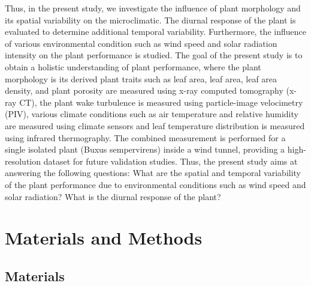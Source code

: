 Thus, in the present study, we investigate the influence of plant morphology and its spatial variability on the microclimatic. The diurnal response of the plant is evaluated to determine additional temporal variability. Furthermore, the influence of various environmental condition such as wind speed and solar radiation intensity on the plant performance is studied. The goal of the present study is to obtain a holistic understanding of plant performance, where the plant morphology is its derived plant traits such as leaf area, leaf area, leaf area density, and plant porosity are measured using x-ray computed tomography (x-ray CT), the plant wake turbulence is measured using particle-image velocimetry (PIV), various climate conditions such as air temperature and relative humidity are measured using climate sensors and leaf temperature distribution is measured using infrared thermography. The combined measurement is performed for a single isolated plant (Buxus sempervirens) inside a wind tunnel, providing a high-resolution dataset for future validation studies. Thus, the present study aims at answering the following questions: What are the spatial and temporal variability of the plant performance due to environmental conditions such as wind speed and solar radiation? What is the diurnal response of the plant? 

\section{Materials and Methods}

\subsection{Materials}


